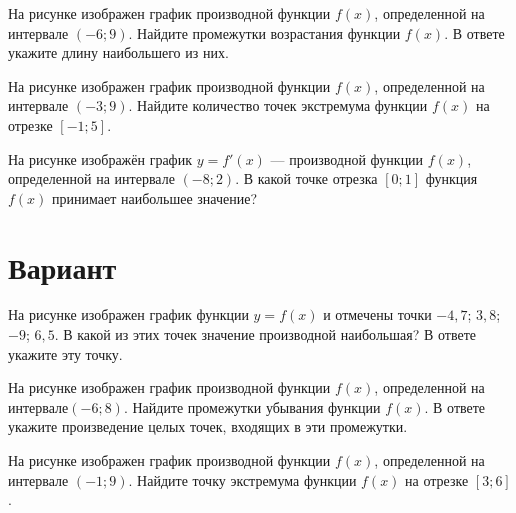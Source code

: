 \begin{taskBN}{2}
На рисунке изображен график производной функции $f(x)$, определенной на интервале $(-6;9)$. Найдите промежутки возрастания функции $f(x)$. В ответе укажите длину наибольшего из них.
\end{taskBN}

\begin{taskBN}{3}
На рисунке изображен график производной функции $f(x)$, определенной на интервале $(-3;9)$. Найдите количество точек экстремума функции $f(x)$ на отрезке $[-1;5]$.
\end{taskBN}

\begin{taskBN}{4}
На рисунке изображён график $y=f'(x)$ — производной функции $f(x)$, определенной на интервале $(-8;2)$. В какой точке отрезка $[0; 1]$ функция $f(x)$ принимает наибольшее значение?
\end{taskBN}

\newpage\section{Вариант}\begin{taskBN}{1}
На рисунке изображен график функции $y=f(x)$ и отмечены точки $-4,7$; $3,8$; $-9$; $6,5$. В какой из этих точек значение производной наибольшая? В ответе укажите эту точку. 
\end{taskBN}

\begin{taskBN}{2}
На рисунке изображен график производной функции $f(x)$, определенной на интервале$(-6; 8)$. Найдите промежутки убывания функции $f(x)$. В ответе укажите произведение целых точек, входящих в эти промежутки.
\end{taskBN}

\begin{taskBN}{3}
На рисунке изображен график производной функции $f(x)$, определенной на интервале $(-1;9)$. Найдите точку экстремума функции $f(x)$ на отрезке $[3;6]$.
\end{taskBN}


